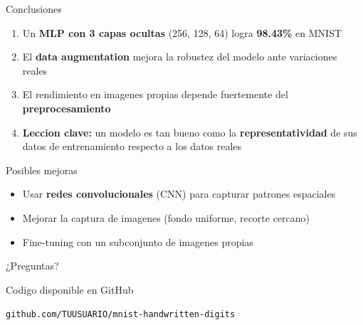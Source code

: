 \documentclass[aspectratio=169]{beamer}
\begin{document}
\begin{frame}{Conclusiones}
\begin{enumerate}
    \item Un \textbf{MLP con 3 capas ocultas} (256, 128, 64) logra \textbf{98.43\%} en MNIST
    \item El \textbf{data augmentation} mejora la robustez del modelo ante variaciones reales
    \item El rendimiento en imagenes propias depende fuertemente del \textbf{preprocesamiento}
    \item \textbf{Leccion clave:} un modelo es tan bueno como la \textbf{representatividad} de sus datos de entrenamiento respecto a los datos reales
\end{enumerate}

\vspace{0.4cm}
\begin{block}{Posibles mejoras}
\begin{itemize}
    \item Usar \textbf{redes convolucionales} (CNN) para capturar patrones espaciales
    \item Mejorar la captura de imagenes (fondo uniforme, recorte cercano)
    \item Fine-tuning con un subconjunto de imagenes propias
\end{itemize}
\end{block}
\end{frame}

\begin{frame}
\begin{center}
    {\Huge ¿Preguntas?}

    \vspace{1cm}
    {\large Codigo disponible en GitHub}

    \vspace{0.3cm}
    \texttt{github.com/TUUSUARIO/mnist-handwritten-digits}
\end{center}
\end{frame}
\end{document}
